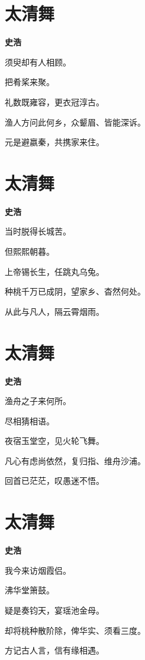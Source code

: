 \documentclass[12pt,a4paper]{ctexbook}
\begin{document}
\section{太清舞}
\textbf{史浩}\par\vspace{0.5em}
须臾却有人相顾。\par
把肴桨来聚。\par
礼数既雍容，更衣冠淳古。\par
渔人方问此何乡，众颦眉、皆能深诉。\par
元是避嬴秦，共携家来住。\par

\section{太清舞}
\textbf{史浩}\par\vspace{0.5em}
当时脱得长城苦。\par
但熙熙朝暮。\par
上帝锡长生，任跳丸乌兔。\par
种桃千万已成阴，望家乡、杳然何处。\par
从此与凡人，隔云霄烟雨。\par

\section{太清舞}
\textbf{史浩}\par\vspace{0.5em}
渔舟之子来何所。\par
尽相猜相语。\par
夜宿玉堂空，见火轮飞舞。\par
凡心有虑尚依然，复归指、维舟沙浦。\par
回首已茫茫，叹愚迷不悟。\par

\section{太清舞}
\textbf{史浩}\par\vspace{0.5em}
我今来访烟霞侣。\par
沸华堂箫鼓。\par
疑是奏钧天，宴瑶池金母。\par
却将桃种散阶除，俾华实、须看三度。\par
方记古人言，信有缘相遇。\par
\end{document}
